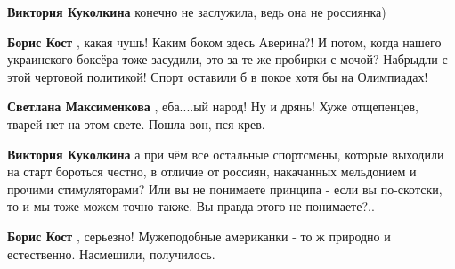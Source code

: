 \begin{itemize}
\begin{itemize}
 
\textbf{Виктория Куколкина} конечно не заслужила, ведь она не россиянка)

 
\textbf{Борис Кост} , какая чушь! Каким боком здесь Аверина?! И потом, когда нашего украинского боксёра тоже засудили, это за те же пробирки с мочой? Набрыдли с этой чертовой политикой! Спорт оставили б в покое хотя бы на Олимпиадах!

 
\textbf{Светлана Максименкова} , еба....ый народ! Ну и дрянь! Хуже отщепенцев, тварей нет на этом свете. Пошла вон, пся крев.

 
\textbf{Виктория Куколкина} а при чём все остальные спортсмены, которые
выходили на старт бороться честно, в отличие от россиян, накачанных мельдонием
и прочими стимуляторами? Или вы не понимаете принципа - если вы по-скотски, то
и мы тоже можем точно также. Вы правда этого не понимаете?..

 
\textbf{Борис Кост} , серьезно! Мужеподобные американки - то ж природно и естественно. Насмешили, получилось.

 

\end{itemize}
\end{itemize}
